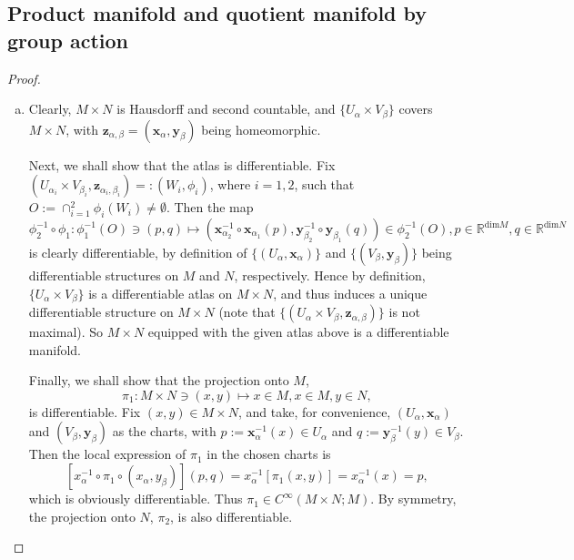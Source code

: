 {

\subsection{Product manifold and quotient manifold by group action}

\newcommand*{\x}{\mathbf{x}}
\newcommand*{\y}{\mathbf{y}}
\newcommand*{\z}{\mathbf{z}}
\newcommand*{\iso}[1]{\stackrel{\mathrm{#1.}}{\cong}}

\begin{proof}
\begin{enumerate}[(a)]
	\item
	Clearly, $M \times N$ is Hausdorff and second countable, and $\{U_\alpha \times V_\beta\}$ covers $M \times N$, with $\z_{\alpha,\beta}=(\x_\alpha,\y_\beta)$ being homeomorphic.
	\par
	Next, we shall show that the atlas is differentiable. Fix $(U_{\alpha_i} \times V_{\beta_i}, \z_{\alpha_i,\beta_i}) =: (W_i,\phi_i)$, where $i=1,2$, such that $O := \cap_{i=1}^2 \phi_i(W_i) \ne \emptyset$. Then the map
	\[\phi_2^{-1} \circ \phi_1: \phi_1^{-1}(O) \ni (p,q) \mapsto \left(\x_{\alpha_2}^{-1} \circ \x_{\alpha_1}(p), \y_{\beta_2}^{-1} \circ \y_{\beta_1}(q)\right) \in \phi_2^{-1}(O), p\in\mathbb{R}^{\mathrm{dim }M}, q\in\mathbb{R}^{\mathrm{dim }N}\]
	is clearly differentiable, by definition of $\{(U_\alpha,\x_\alpha)\}$ and $\{(V_\beta,\y_\beta)\}$ being differentiable structures on $M$ and $N$, respectively. Hence by definition, $\{U_\alpha \times V_\beta\}$ is a differentiable atlas on $M \times N$, and thus induces a unique differentiable structure on $M \times N$ (note that $\{(U_\alpha \times V_\beta,\z_{\alpha,\beta})\}$ is not maximal). So $M \times N$ equipped with the given atlas above is a differentiable manifold.
	\par
	Finally, we shall show that the projection onto $M$, 
	\[\pi_1: M \times N \ni (x,y) \mapsto x \in M, x \in M, y \in N,\]
	is differentiable. Fix $(x,y) \in M \times N$, and take, for convenience, $(U_\alpha, \x_\alpha)$ and $(V_\beta, \y_\beta)$ as the charts, with $p:= \x_\alpha^{-1}(x) \in U_\alpha$ and $q:= \y_\beta^{-1}(y) \in V_\beta$. Then the local expression of $\pi_1$ in the chosen charts is 
	\[ \left[x_\alpha^{-1} \circ \pi_1 \circ (x_\alpha, y_\beta)\right](p,q) = x_\alpha^{-1}[\pi_1(x,y)] = x_\alpha^{-1}(x) = p,\]
	which is obviously differentiable. Thus $\pi_1 \in C^\infty(M \times N; M)$.	By symmetry, the projection onto $N$, $\pi_2$, is also differentiable.
	

\end{enumerate}
\end{proof}}
